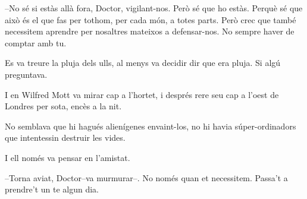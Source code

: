 --No sé si estàs allà fora, Doctor, vigilant-nos. Però sé que ho estàs.
Perquè sé que això és el que fas per tothom, per cada món, a totes
parts. Però crec que també necessitem aprendre per nosaltres mateixos a
defensar-nos. No sempre haver de comptar amb tu.

Es va treure la pluja dels ulls, al menys va decidir dir que era pluja.
Si algú preguntava.

I en Wilfred Mott va mirar cap a l'hortet, i després rere seu cap a
l'oest de Londres per sota, encès a la nit.

No semblava que hi hagués alienígenes envaint-los, no hi havia
súper-ordinadors que intentessin destruir les vides.

I ell només va pensar en l'amistat.

--Torna aviat, Doctor--va murmurar--. No només quan et necessitem.
Passa't a prendre't un te algun dia.
